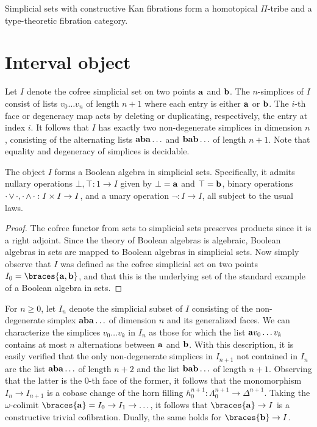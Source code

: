 \documentclass[reqno,10pt,a4paper,oneside]{amsart}
\begin{document}
\begin{corollary}
Simplicial sets with constructive Kan fibrations form a homotopical $\Pi$-tribe and a type-theoretic fibration category.
\end{corollary}

\section{Interval object}

Let $I$ denote the cofree simplicial set on two points $\mathbf{a}$ and $\mathbf{b}$.
The $n$-simplices of $I$ consist of lists $v_0 \ldots v_n$ of length $n+1$ where each entry is either $\mathbf{a}$ or $\mathbf{b}$.
The $i$-th face or degeneracy map acts by deleting or duplicating, respectively, the entry at index $i$.
It follows that $I$ has exactly two non-degenerate simplices in dimension $n$, consisting of the alternating lists $\mathbf{a} \mathbf{b} \mathbf{a} \ldots$ and $\mathbf{b} \mathbf{a} \mathbf{b} \ldots$ of length $n+1$.
Note that equality and degeneracy of simplices is decidable.

\begin{lemma}
The object $I$ forms a Boolean algebra in simplicial sets.
Specifically, it admits nullary operations $\bot, \top : 1 \to I$ given by $\bot = \mathbf{a}$ and $\top = \mathbf{b}$, binary operations $\mathop{\cdot} \vee \mathop{\cdot}, \mathop{\cdot} \wedge \mathop{\cdot} : I \times I \to I$, and a unary operation $\neg : I \to I$, all subject to the usual laws.
\end{lemma}

\begin{proof}
The cofree functor from sets to simplicial sets preserves products since it is a right adjoint.
Since the theory of Boolean algebras is algebraic, Boolean algebras in sets are mapped to Boolean algebras in simplicial sets.
Now simply observe that $I$ was defined as the cofree simplicial set on two points $I_0 = \braces{\ptA, \ptB}$, and that this is the underlying set of the standard example of a Boolean algebra in sets.
\end{proof}

For $n \geq 0$, let $I_n$ denote the simplicial subset of $I$ consisting of the non-degenerate simplex $\mathbf{a} \mathbf{b} \mathbf{a} \ldots$ of dimension $n$ and its generalized faces.
We can characterize the simplices $v_0 \ldots v_k$ in $I_n$ as those for which the list $\mathbf{a} v_0 \ldots v_k$ contains at most $n$ alternations between $\mathbf{a}$ and $\mathbf{b}$.
With this description, it is easily verified that the only non-degenerate simplices in $I_{n+1}$ not contained in $I_n$ are the list $\mathbf{a} \mathbf{b} \mathbf{a} \ldots$ of length $n+2$ and the list $\mathbf{b} \mathbf{a} \mathbf{b} \ldots$ of length $n+1$.
Observing that the latter is the $0$-th face of the former, it follows that the monomorphism $I_n \to I_{n+1}$ is a cobase change of the horn filling $h_{0}^{n+1} : \Lambda_0^{n+1} \to \Delta^{n+1}$.
Taking the $\omega$-colimit $\braces{\ptA} = I_0 \to I_1 \to \ldots$, it follows that $\braces{\ptA} \to I$ is a constructive trivial cofibration.
Dually, the same holds for $\braces{\ptB} \to I$.
\end{document}
